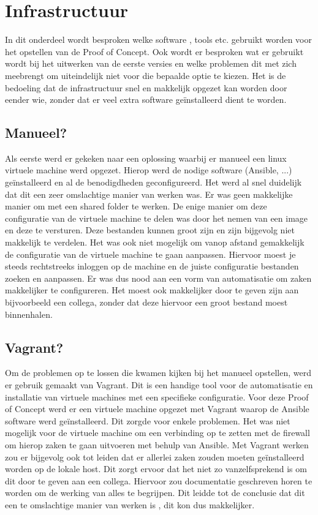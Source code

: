 \section{Infrastructuur}
In dit onderdeel wordt besproken welke software , tools etc. gebruikt worden voor het opstellen van de Proof of Concept. Ook wordt er besproken wat er gebruikt wordt bij het uitwerken van de eerste versies en welke problemen dit met zich meebrengt om uiteindelijk niet voor die bepaalde optie te kiezen. Het is de bedoeling dat de infrastructuur snel en makkelijk opgezet kan worden door eender wie, zonder dat er veel extra software geïnstalleerd dient te worden. 
\subsection{Manueel?}
Als eerste werd er gekeken naar een oplossing waarbij er manueel een linux virtuele machine werd opgezet. Hierop werd de nodige software (Ansible, ...) geïnstalleerd en al de benodigdheden geconfigureerd. Het werd al snel duidelijk dat dit een zeer omslachtige manier van werken was. Er was geen makkelijke manier om met een shared folder te werken. De enige manier om deze configuratie van de virtuele machine te delen was door het nemen van een image en deze te versturen. Deze bestanden kunnen groot zijn en zijn bijgevolg niet makkelijk te verdelen. Het was ook niet mogelijk om vanop afstand gemakkelijk de configuratie van de virtuele machine te gaan aanpassen. Hiervoor moest je steeds rechtstreeks inloggen op de machine en de juiste configuratie bestanden zoeken en aanpassen. Er was dus nood aan een vorm van automatisatie om zaken makkelijker te configureren. Het moest ook makkelijker door te geven zijn aan bijvoorbeeld een collega, zonder dat deze hiervoor een groot bestand moest binnenhalen. 
\subsection{Vagrant?}
Om de problemen op te lossen die kwamen kijken bij het manueel opstellen, werd er gebruik gemaakt van Vagrant. Dit is een handige tool voor de automatisatie en installatie van virtuele machines met een specifieke configuratie. Voor deze Proof of Concept werd er een virtuele machine opgezet met Vagrant waarop de Ansible software werd geïnstalleerd. Dit zorgde voor enkele problemen. Het was niet mogelijk voor de virtuele machine om een verbinding op te zetten met de firewall om hierop zaken te gaan uitvoeren met behulp van Ansible. Met Vagrant werken zou er bijgevolg ook tot leiden dat er allerlei zaken zouden moeten geïnstalleerd worden op de lokale host. Dit zorgt ervoor dat het niet zo vanzelfsprekend is om dit door te geven aan een collega. Hiervoor zou documentatie geschreven horen te worden om de werking van alles te begrijpen. Dit leidde tot de conclusie dat dit een te omslachtige manier van werken is , dit kon dus makkelijker. 
\newpage

